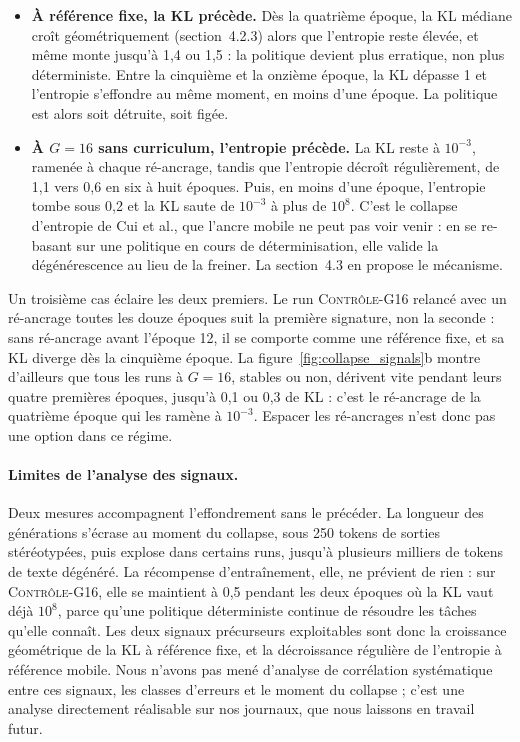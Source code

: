 \documentclass[11pt,a4paper]{article}
\begin{document}
\begin{itemize}
    \item \textbf{À référence fixe, la KL précède.} Dès la quatrième époque, la KL médiane croît géométriquement (section~4.2.3) alors que l'entropie reste élevée, et même monte jusqu'à 1{,}4 ou 1{,}5 : la politique devient plus erratique, non plus déterministe. Entre la cinquième et la onzième époque, la KL dépasse 1 et l'entropie s'effondre au même moment, en moins d'une époque. La politique est alors soit détruite, soit figée.
    \item \textbf{À $G=16$ sans curriculum, l'entropie précède.} La KL reste à $10^{-3}$, ramenée à chaque ré-ancrage, tandis que l'entropie décroît régulièrement, de 1{,}1 vers 0{,}6 en six à huit époques. Puis, en moins d'une époque, l'entropie tombe sous 0{,}2 et la KL saute de $10^{-3}$ à plus de $10^{8}$. C'est le collapse d'entropie de Cui et al., que l'ancre mobile ne peut pas voir venir : en se re-basant sur une politique en cours de déterminisation, elle valide la dégénérescence au lieu de la freiner. La section~4.3 en propose le mécanisme.
\end{itemize}

Un troisième cas éclaire les deux premiers. Le run \textsc{Contrôle-G16} relancé avec un ré-ancrage toutes les douze époques suit la première signature, non la seconde : sans ré-ancrage avant l'époque 12, il se comporte comme une référence fixe, et sa KL diverge dès la cinquième époque. La figure~\ref{fig:collapse_signals}b montre d'ailleurs que tous les runs à $G=16$, stables ou non, dérivent vite pendant leurs quatre premières époques, jusqu'à 0{,}1 ou 0{,}3 de KL : c'est le ré-ancrage de la quatrième époque qui les ramène à $10^{-3}$. Espacer les ré-ancrages n'est donc pas une option dans ce régime.

\paragraph{Limites de l'analyse des signaux.} Deux mesures accompagnent l'effondrement sans le précéder. La longueur des générations s'écrase au moment du collapse, sous 250 tokens de sorties stéréotypées, puis explose dans certains runs, jusqu'à plusieurs milliers de tokens de texte dégénéré. La récompense d'entraînement, elle, ne prévient de rien : sur \textsc{Contrôle-G16}, elle se maintient à 0{,}5 pendant les deux époques où la KL vaut déjà $10^{8}$, parce qu'une politique déterministe continue de résoudre les tâches qu'elle connaît. Les deux signaux précurseurs exploitables sont donc la croissance géométrique de la KL à référence fixe, et la décroissance régulière de l'entropie à référence mobile. Nous n'avons pas mené d'analyse de corrélation systématique entre ces signaux, les classes d'erreurs et le moment du collapse ; c'est une analyse directement réalisable sur nos journaux, que nous laissons en travail futur.
\end{document}

